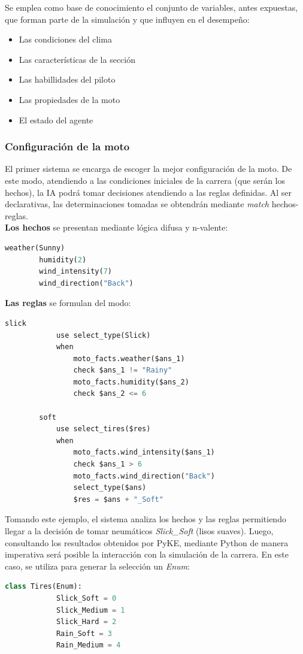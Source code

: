 \documentclass[12pt, letterpaper,spanish]{article}
\theoremstyle{definition}
\theoremstyle{remark}
\begin{document}
	Se emplea como base de conocimiento el conjunto de variables, antes expuestas, que forman parte de la simulación y que influyen en el desempeño:
	\begin{itemize}
		\item Las condiciones del clima
		\item Las características de la sección
		\item Las habillidades del piloto
		\item Las propiedades de la moto
		\item El estado del agente
	\end{itemize}
	
		\subsubsection{Configuración de la moto}
		El primer sistema se encarga de escoger la mejor configuración de la moto. De este modo, atendiendo a las condiciones iniciales de la carrera (que serán los hechos), la IA podrá tomar decisiones atendiendo a las reglas definidas. Al ser declarativas, las determinaciones tomadas se obtendrán mediante \emph{match} hechos-reglas. \\
		
		\textbf{Los hechos} se presentan mediante lógica difusa y n-valente:
		\begin{lstlisting}[language={Python}, label={Script}]
		weather(Sunny)
		humidity(2)
		wind_intensity(7)
		wind_direction("Back")
		\end{lstlisting}
	
		\textbf{Las reglas} se formulan del modo:
		\begin{lstlisting}[language={Python}, label={Script}]
		slick
		    use select_type(Slick)
		    when
		        moto_facts.weather($ans_1)
		        check $ans_1 != "Rainy"
		        moto_facts.humidity($ans_2)
		        check $ans_2 <= 6
		
		soft
		    use select_tires($res)
		    when
		        moto_facts.wind_intensity($ans_1)
		        check $ans_1 > 6
		        moto_facts.wind_direction("Back")
		        select_type($ans)
		        $res = $ans + "_Soft"
		\end{lstlisting}

		Tomando este ejemplo, el sistema analiza los hechos y las reglas permitiendo llegar a la decisión de tomar neumáticos \emph{Slick\_Soft} (lisos suaves). Luego, consultando los resultados obtenidos por PyKE, mediante Python de manera imperativa será posible la interacción con la simulación de la carrera. En este caso, se utiliza para generar la selección un \emph{Enum}:
		\begin{lstlisting}[language={Python}, label={Script}]
		class Tires(Enum):
		    Slick_Soft = 0
		    Slick_Medium = 1
		    Slick_Hard = 2
		    Rain_Soft = 3
		    Rain_Medium = 4
		\end{lstlisting}
\end{document}
